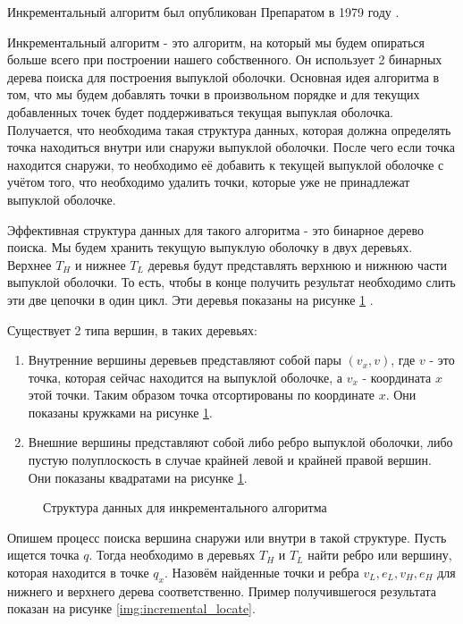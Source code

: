 Инкрементальный алгоритм был опубликован Препаратом в 1979 году \cite{preparata1979Incremental}.

Инкрементальный алгоритм - это алгоритм, на который мы будем опираться больше всего при построении нашего собственного. Он использует 2 бинарных дерева поиска для построения выпуклой оболочки. Основная идея алгоритма в том, что мы будем добавлять точки в произвольном порядке и для текущих добавленных точек будет поддерживаться текущая выпуклая оболочка. Получается, что необходима такая структура данных, которая должна определять точка находиться внутри или снаружи выпуклой оболочки. После чего если точка находится снаружи, то необходимо её добавить к текущей выпуклой оболочке с учётом того, что необходимо удалить точки, которые уже не принадлежат выпуклой оболочке.

Эффективная структура данных для такого алгоритма - это бинарное дерево поиска. Мы будем хранить текущую выпуклую оболочку в двух деревьях. Верхнее $T_H$ и нижнее $T_L$ деревья будут представлять верхнюю и нижнюю части выпуклой оболочки. То есть, чтобы в конце получить результат необходимо слить эти две цепочки в один цикл. Эти деревья показаны на рисунке \ref{img:incremental_trees} \cite{instructor2004incremental}.

Существует 2 типа вершин, в таких деревьях:
\begin{enumerate}
	\item Внутренние вершины деревьев представляют собой пары $(v_x, v)$, где $v$ - это точка, которая сейчас находится на выпуклой оболочке, а $v_x$ - координата $x$ этой точки. Таким образом точка отсортированы по координате $x$. Они показаны кружками на рисунке \ref{img:incremental_trees}.
	\item Внешние вершины представляют собой либо ребро выпуклой оболочки, либо пустую полуплоскость в случае крайней левой и крайней правой вершин. Они показаны квадратами на рисунке \ref{img:incremental_trees}.
\end{enumerate}

\begin{figure}[ht] 
	\centering
	
	\caption{Структура данных для инкрементального алгоритма}
	\label{img:incremental_trees}
\end{figure}

Опишем процесс поиска вершина снаружи или внутри в такой структуре. Пусть ищется точка $q$. Тогда необходимо в деревьях $T_H$ и $T_L$ найти ребро или вершину, которая находится в точке $q_x$. Назовём найденные точки и ребра $v_L, e_L, v_H, e_H$ для нижнего и верхнего дерева соответственно. Пример получившегося результата показан на рисунке \ref{img:incremental_locate}.

